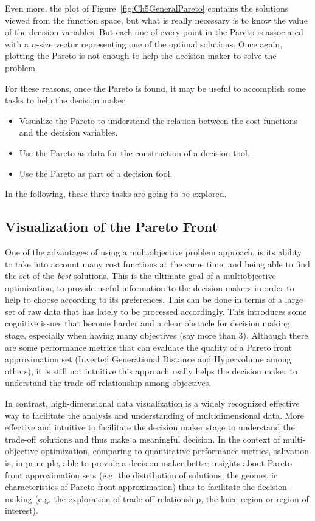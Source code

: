Even more, the plot of Figure~\ref{fig:Ch5GeneralPareto} contains the solutions viewed from the function space, but what is really necessary is to know the value of the decision variables. But each one of every point in the Pareto is associated with a $n$-size vector representing one of the optimal solutions. Once again, plotting the Pareto is not enough to help the decision maker to solve the problem.

For these reasons, once the Pareto is found, it may be useful to accomplish some tasks to help the decision maker:
\begin{itemize}
	\item  Visualize the Pareto to understand the relation between the cost functions and the decision variables.
	\item Use the Pareto as data for the construction of a decision tool.
	\item Use the Pareto as part of a decision tool.
\end{itemize}
In the following, these three tasks are going to be explored.
%
\subsection{Visualization of the Pareto Front}
\label{sec:ParetoVisualization}
%
One of the advantages of using a multiobjective problem approach, is its ability to take into account many cost functions at the same time, and being able to find the set of the \emph{best} solutions. This is the ultimate goal of a multiobjective optimization, to provide useful information to the decision makers in order to help to choose according to its preferences. This can be done in terms of a large set of raw data that has lately to be processed accordingly. This introduces some cognitive issues that become harder and a clear obstacle for decision making stage, especially when having many objectives (say more than 3). Although there are some performance metrics that can evaluate the quality of a Pareto front approximation set (Inverted Generational Distance \citep{Bosman2003} and Hypervolume \citep{Zitzler1999} among others), it is still not intuitive this approach really helps the decision maker to understand the trade-off relationship among objectives.

In contrast, high-dimensional data visualization is a widely recognized effective way to facilitate the analysis and understanding of multidimensional data. More effective and intuitive to facilitate the decision maker stage to understand the trade-off solutions and thus make a meaningful decision. In the context of multi-objective optimization, comparing to quantitative performance metrics, salivation is, in principle, able to provide a decision maker better insights about Pareto front approximation sets (e.g. the distribution of solutions, the geometric characteristics of Pareto front approximation) thus to facilitate the decision-making (e.g. the exploration of trade-off relationship, the knee region or region of interest).

